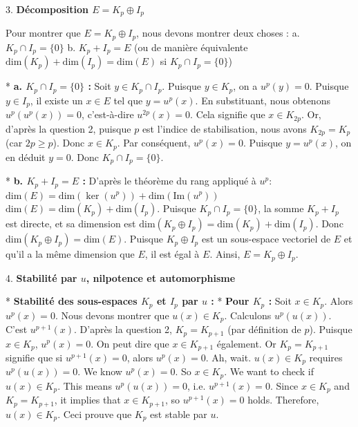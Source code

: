\documentclass{report}
\begin{document}
3.  \textbf{Décomposition $E = K_p \oplus I_p$}

    Pour montrer que $E = K_p \oplus I_p$, nous devons montrer deux choses :
    a. $K_p \cap I_p = \{0\}$
    b. $K_p + I_p = E$ (ou de manière équivalente $\mathrm{dim}(K_p) + \mathrm{dim}(I_p) = \mathrm{dim}(E)$ si $K_p \cap I_p = \{0\}$)

    *   \textbf{a. $K_p \cap I_p = \{0\}$ :}
        Soit $y \in K_p \cap I_p$.
        Puisque $y \in K_p$, on a $u^p(y) = 0$.
        Puisque $y \in I_p$, il existe un $x \in E$ tel que $y = u^p(x)$.
        En substituant, nous obtenons $u^p(u^p(x)) = 0$, c'est-à-dire $u^{2p}(x) = 0$.
        Cela signifie que $x \in K_{2p}$.
        Or, d'après la question 2, puisque $p$ est l'indice de stabilisation, nous avons $K_{2p} = K_p$ (car $2p \ge p$).
        Donc $x \in K_p$.
        Par conséquent, $u^p(x) = 0$.
        Puisque $y = u^p(x)$, on en déduit $y = 0$.
        Donc $K_p \cap I_p = \{0\}$.

    *   \textbf{b. $K_p + I_p = E$ :}
        D'après le théorème du rang appliqué à $u^p$:
        $\mathrm{dim}(E) = \mathrm{dim}(\ker(u^p)) + \mathrm{dim}(\mathrm{Im}(u^p))$
        $\mathrm{dim}(E) = \mathrm{dim}(K_p) + \mathrm{dim}(I_p)$.
        Puisque $K_p \cap I_p = \{0\}$, la somme $K_p + I_p$ est directe, et sa dimension est $\mathrm{dim}(K_p \oplus I_p) = \mathrm{dim}(K_p) + \mathrm{dim}(I_p)$.
        Donc $\mathrm{dim}(K_p \oplus I_p) = \mathrm{dim}(E)$.
        Puisque $K_p \oplus I_p$ est un sous-espace vectoriel de $E$ et qu'il a la même dimension que $E$, il est égal à $E$.
        Ainsi, $E = K_p \oplus I_p$.

4.  \textbf{Stabilité par $u$, nilpotence et automorphisme}

    *   \textbf{Stabilité des sous-espaces $K_p$ et $I_p$ par $u$ :}
        *   \textbf{Pour $K_p$ :}
            Soit $x \in K_p$. Alors $u^p(x) = 0$.
            Nous devons montrer que $u(x) \in K_p$.
            Calculons $u^p(u(x))$. C'est $u^{p+1}(x)$.
            D'après la question 2, $K_p = K_{p+1}$ (par définition de $p$).
            Puisque $x \in K_p$, $u^p(x)=0$. On peut dire que $x \in K_{p+1}$ également.
            Or $K_p = K_{p+1}$ signifie que si $u^{p+1}(x) = 0$, alors $u^p(x) = 0$.
            Ah, wait. $u(x) \in K_p$ requires $u^p(u(x))=0$.
            We know $u^p(x)=0$. So $x \in K_p$.
            We want to check if $u(x) \in K_p$. This means $u^p(u(x))=0$, i.e. $u^{p+1}(x)=0$.
            Since $x \in K_p$ and $K_p = K_{p+1}$, it implies that $x \in K_{p+1}$, so $u^{p+1}(x)=0$ holds.
            Therefore, $u(x) \in K_p$.
            Ceci prouve que $K_p$ est stable par $u$.
\end{document}
